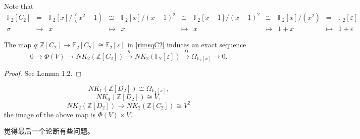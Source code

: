 Note that 
\begin{align*}
\mathbb{F}_2[C_2]&=&\mathbb{F}_2[x]/(x^2-1) &\cong& \mathbb{F}_2[x]/(x-1)^2 &\cong& \mathbb{F}_2[x-1]/(x-1)^2 &\cong& \mathbb{F}_2[x]/(x^2)&=& \mathbb{F}_2[\varepsilon] \\
\sigma \quad& \mapsto& x \qquad  & \mapsto& x \qquad & \mapsto& x \quad\qquad & \mapsto& 1+x \quad & \mapsto& 1+\varepsilon
\end{align*}

\begin{lemma}
\label{lem:omega}
	The map $q \colon \mathbb{Z}[C_2] \longrightarrow \mathbb{F}_2[C_2] \cong \mathbb{F}_2[\varepsilon]$ in \ref{rimsqC2} induces an exact sequence
	\[0\longrightarrow \Phi(V) \longrightarrow NK_2(\mathbb{Z}[C_2])\overset{q}\longrightarrow NK_2(\mathbb{F}_2[\varepsilon])\overset{D}\longrightarrow \Omega_{\mathbb{F}_2[x]}\longrightarrow 0.\]
\end{lemma}
\begin{proof}
	See \cite{weibel2009nk0} Lemma 1.2.
\end{proof}
\begin{theorem}
	\[NK_1(\mathbb{Z}[D_2]) \cong \Omega_{\mathbb{F}_2[x]},\] 
	\[NK_0(\mathbb{Z}[D_2])\cong V,\]
	\[NK_2(\mathbb{Z}[D_2]) \longrightarrow NK_2(\mathbb{Z}[C_2])\cong V^2\]
	the image of the above map is $\Phi(V) \times V$.
\end{theorem}
觉得最后一个论断有些问题。
